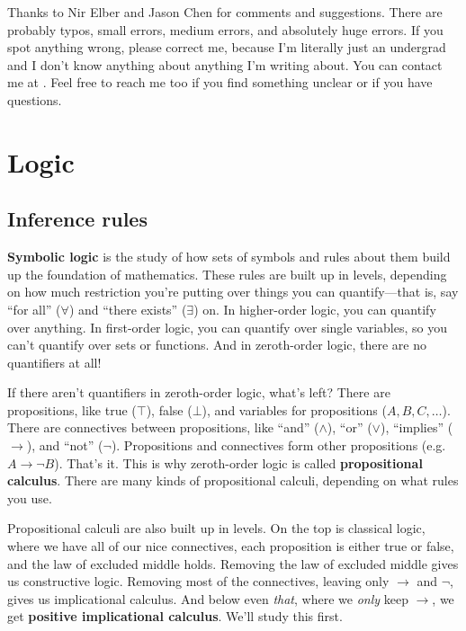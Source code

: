 \documentclass[11pt,paper=letter]{scrartcl}
\renewcommand{\land}{\wedge}
\renewcommand{\lor}{\vee}
\renewcommand{\lnot}{\neg}
\newcommand{\true}{\top}
\newcommand{\false}{\bot}
\begin{document}
Thanks to Nir Elber and Jason Chen for comments and suggestions. There are probably typos, small errors, medium errors, and absolutely huge errors. If you spot anything wrong, please correct me, because I'm literally just an undergrad and I don't know anything about anything I'm writing about. You can contact me at . Feel free to reach me too if you find something unclear or if you have questions.

\clearpage

\section{Logic}

\subsection{Inference rules}

\textbf{Symbolic logic} is the study of how sets of symbols and rules about them build up the foundation of mathematics. These rules are built up in levels, depending on how much restriction you're putting over things you can quantify---that is, say ``for all'' ($\forall$) and ``there exists'' ($\exists$) on. In higher-order logic, you can quantify over anything. In first-order logic, you can quantify over single variables, so you can't quantify over sets or functions. And in zeroth-order logic, there are no quantifiers at all!

If there aren't quantifiers in zeroth-order logic, what's left? There are propositions, like true ($\true$), false ($\false$), and variables for propositions ($A, B, C, \dots$). There are connectives between propositions, like ``and'' ($\land$), ``or'' ($\lor$), ``implies'' ($\to$), and ``not'' ($\lnot$). Propositions and connectives form other propositions (e.g. $A \to \lnot B$). That's it. This is why zeroth-order logic is called \textbf{propositional calculus}. There are many kinds of propositional calculi, depending on what rules you use.

Propositional calculi are also built up in levels. On the top is classical logic, where we have all of our nice connectives, each proposition is either true or false, and the law of excluded middle holds. Removing the law of excluded middle gives us constructive logic. Removing most of the connectives, leaving only $\to$ and $\lnot$, gives us implicational calculus. And below even \emph{that}, where we \emph{only} keep $\to$, we get \textbf{positive implicational calculus}. We'll study this first.
\end{document}
